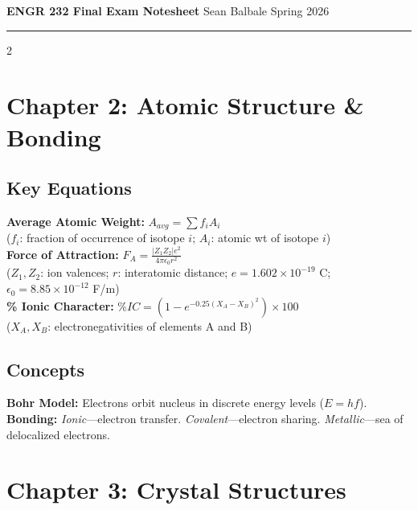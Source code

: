 \documentclass[8pt]{extarticle}
\date{}
\begin{document}
\normalsize \textbf{ENGR 232 Final Exam Notesheet} \hfill Sean Balbale \hfill Spring 2026 \vspace{0.03cm}
\hrule
\vspace{0.03cm}
\begin{multicols*}{2}

\section*{Chapter 2: Atomic Structure \& Bonding}
\subsection*{Key Equations}
\textbf{Average Atomic Weight:} $A_{avg} = \sum f_i A_i$ \\
($f_i$: fraction of occurrence of isotope $i$; $A_i$: atomic wt of isotope $i$) \\
\textbf{Force of Attraction:} $F_A = \frac{|Z_1 Z_2| e^2}{4\pi\epsilon_0 r^2}$ \\
($Z_1,Z_2$: ion valences; $r$: interatomic distance; $e=1.602\times10^{-19}$ C; $\epsilon_0=8.85\times10^{-12}$ F/m) \\
\textbf{\% Ionic Character:} $\%IC = \left(1-e^{-0.25(X_A-X_B)^2}\right)\times 100$ \\
($X_A, X_B$: electronegativities of elements A and B)
\subsection*{Concepts}
\textbf{Bohr Model:} Electrons orbit nucleus in discrete energy levels ($E=hf$). \\
\textbf{Bonding:} \textit{Ionic}—electron transfer. \textit{Covalent}—electron sharing. \textit{Metallic}—sea of delocalized electrons.

\section*{Chapter 3: Crystal Structures}

\end{multicols*}
\end{document}
